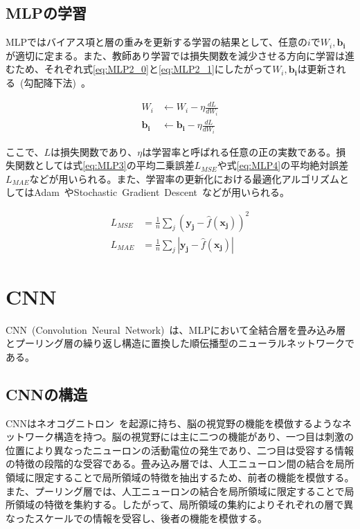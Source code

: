 \subsection{MLPの学習}

MLPではバイアス項と層の重みを更新する学習の結果として、任意の$i$で$W_i,\boldsymbol{b_i}$が適切に定まる。また、教師あり学習では損失関数を減少させる方向に学習は進むため、それぞれ式\ref{eq:MLP2_0}と\ref{eq:MLP2_1}にしたがって$W_i,\boldsymbol{b_i}$は更新される~(勾配降下法)~。

\begin{align}
    \label{eq:MLP2_0}
    W _i &\leftarrow W_i - \eta \frac{d L}{dW_i} \\
    \label{eq:MLP2_1}
    \boldsymbol{b _i} &\leftarrow \boldsymbol{b_i} - \eta \frac{d L}{dW_i}
\end{align}

\clearpage

ここで、$L$は損失関数であり、$\eta$は学習率と呼ばれる任意の正の実数である。損失関数としては式\ref{eq:MLP3}の平均二乗誤差$L_{MSE}$や式\ref{eq:MLP4}の平均絶対誤差$L_{MAE}$などが用いられる。また、学習率の更新化における最適化アルゴリズムとしてはAdam~\cite{Adam}やStochastic~Gradient~Descent~\cite{SGD}などが用いられる。

\begin{align}
    \label{eq:MLP3}
    L_{MSE}&=\frac{1}{n}\sum _{j} {(\boldsymbol{y_j} - \hat{f}(\boldsymbol{x_j}))^2}\\
    \label{eq:MLP4}
    L_{MAE}&=\frac{1}{n}\sum _{j} {|\boldsymbol{y_j} - \hat{f}(\boldsymbol{x_j})|}
\end{align}

\section{CNN}

CNN~(Convolution~Neural~Network)~は、MLPにおいて全結合層を畳み込み層とプーリング層の繰り返し構造に置換した順伝播型のニューラルネットワークである。

\subsection{CNNの構造}

CNNはネオコグニトロン~\cite{neocognition}を起源に持ち、脳の視覚野の機能を模倣するようなネットワーク構造を持つ。脳の視覚野には主に二つの機能があり、一つ目は刺激の位置により異なったニューロンの活動電位の発生であり、二つ目は受容する情報の特徴の段階的な受容である。畳み込み層では、人工ニューロン間の結合を局所領域に限定することで局所領域の特徴を抽出するため、前者の機能を模倣する。また、プーリング層では、人工ニューロンの結合を局所領域に限定することで局所領域の特徴を集約する。したがって、局所領域の集約によりそれぞれの層で異なったスケールでの情報を受容し、後者の機能を模倣する。

